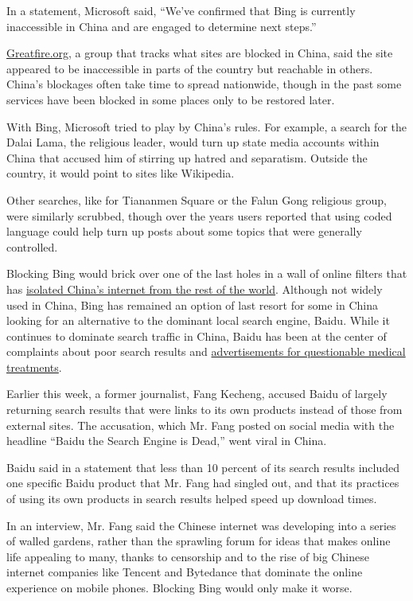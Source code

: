 In a statement, Microsoft said, ``We've confirmed that Bing is currently
inaccessible in China and are engaged to determine next steps.''

\href{http://greatfire.org/}{Greatfire.org}, a group that tracks what
sites are blocked in China, said the site appeared to be inaccessible in
parts of the country but reachable in others. China's blockages often
take time to spread nationwide, though in the past some services have
been blocked in some places only to be restored later.

With Bing, Microsoft tried to play by China's rules. For example, a
search for the Dalai Lama, the religious leader, would turn up state
media accounts within China that accused him of stirring up hatred and
separatism. Outside the country, it would point to sites like Wikipedia.

Other searches, like for Tiananmen Square or the Falun Gong religious
group, were similarly scrubbed, though over the years users reported
that using coded language could help turn up posts about some topics
that were generally controlled.

Blocking Bing would brick over one of the last holes in a wall of online
filters that has
\href{https://www.nytimes.com/2018/08/06/technology/china-generation-blocked-internet.html}{isolated
China's internet from the rest of the world}. Although not widely used
in China, Bing has remained an option of last resort for some in China
looking for an alternative to the dominant local search engine, Baidu.
While it continues to dominate search traffic in China, Baidu has been
at the center of complaints about poor search results and
\href{https://www.nytimes.com/2016/05/04/world/asia/china-baidu-investigation-student-cancer.html}{advertisements
for questionable medical treatments}.

Earlier this week, a former journalist, Fang Kecheng, accused Baidu of
largely returning search results that were links to its own products
instead of those from external sites. The accusation, which Mr. Fang
posted on social media with the headline ``Baidu the Search Engine is
Dead,'' went viral in China.

Baidu said in a statement that less than 10 percent of its search
results included one specific Baidu product that Mr. Fang had singled
out, and that its practices of using its own products in search results
helped speed up download times.

In an interview, Mr. Fang said the Chinese internet was developing into
a series of walled gardens, rather than the sprawling forum for ideas
that makes online life appealing to many, thanks to censorship and to
the rise of big Chinese internet companies like Tencent and Bytedance
that dominate the online experience on mobile phones. Blocking Bing
would only make it worse.

